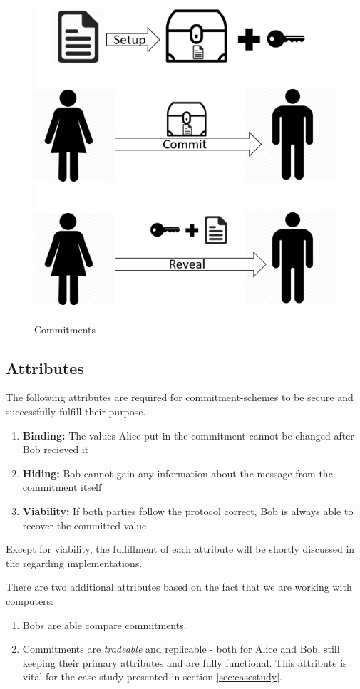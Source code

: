 \documentclass[conference]{IEEEtran}
\begin{document}
\begin{figure}
	\centering
	\includegraphics[width=0.8\linewidth]{Images/protocoll}
	\caption[Commitments]{Commitments}
	\label{fig:protocoll}
\end{figure}

\subsection{Attributes}
The following attributes are required for commitment-schemes to be secure and successfully fulfill their purpose.

\begin{enumerate}
	\item \textbf{Binding:} The values Alice put in the commitment cannot be changed after Bob recieved it 
	\item \textbf{Hiding:} Bob cannot gain any information about the message from the commitment itself
	\item \textbf{Viability:} If both parties follow the protocol correct, Bob is always able to recover the committed value
\end{enumerate}
Except for viability, the fulfillment of each attribute will be shortly discussed in the regarding implementations. 

There are two additional attributes based on the fact that we are working with computers:
\begin{enumerate}
	\item Bobs are able compare commitments.
	\item Commitments are \textit{tradeable} and replicable - both for Alice and Bob, still keeping their primary attributes and are fully functional. This attribute is vital for the case study presented in section \ref{sec:casestudy}.
\end{enumerate}
\end{document}
